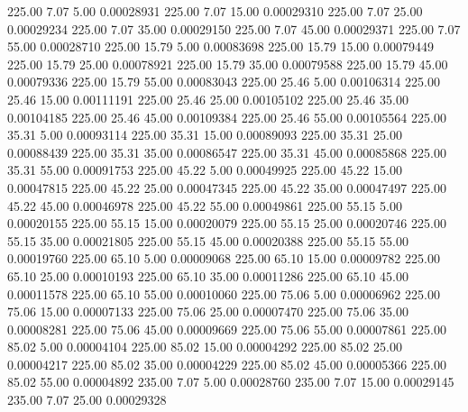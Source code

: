     225.00      7.07      5.00     0.00028931
    225.00      7.07     15.00     0.00029310
    225.00      7.07     25.00     0.00029234
    225.00      7.07     35.00     0.00029150
    225.00      7.07     45.00     0.00029371
    225.00      7.07     55.00     0.00028710
    225.00     15.79      5.00     0.00083698
    225.00     15.79     15.00     0.00079449
    225.00     15.79     25.00     0.00078921
    225.00     15.79     35.00     0.00079588
    225.00     15.79     45.00     0.00079336
    225.00     15.79     55.00     0.00083043
    225.00     25.46      5.00     0.00106314
    225.00     25.46     15.00     0.00111191
    225.00     25.46     25.00     0.00105102
    225.00     25.46     35.00     0.00104185
    225.00     25.46     45.00     0.00109384
    225.00     25.46     55.00     0.00105564
    225.00     35.31      5.00     0.00093114
    225.00     35.31     15.00     0.00089093
    225.00     35.31     25.00     0.00088439
    225.00     35.31     35.00     0.00086547
    225.00     35.31     45.00     0.00085868
    225.00     35.31     55.00     0.00091753
    225.00     45.22      5.00     0.00049925
    225.00     45.22     15.00     0.00047815
    225.00     45.22     25.00     0.00047345
    225.00     45.22     35.00     0.00047497
    225.00     45.22     45.00     0.00046978
    225.00     45.22     55.00     0.00049861
    225.00     55.15      5.00     0.00020155
    225.00     55.15     15.00     0.00020079
    225.00     55.15     25.00     0.00020746
    225.00     55.15     35.00     0.00021805
    225.00     55.15     45.00     0.00020388
    225.00     55.15     55.00     0.00019760
    225.00     65.10      5.00     0.00009068
    225.00     65.10     15.00     0.00009782
    225.00     65.10     25.00     0.00010193
    225.00     65.10     35.00     0.00011286
    225.00     65.10     45.00     0.00011578
    225.00     65.10     55.00     0.00010060
    225.00     75.06      5.00     0.00006962
    225.00     75.06     15.00     0.00007133
    225.00     75.06     25.00     0.00007470
    225.00     75.06     35.00     0.00008281
    225.00     75.06     45.00     0.00009669
    225.00     75.06     55.00     0.00007861
    225.00     85.02      5.00     0.00004104
    225.00     85.02     15.00     0.00004292
    225.00     85.02     25.00     0.00004217
    225.00     85.02     35.00     0.00004229
    225.00     85.02     45.00     0.00005366
    225.00     85.02     55.00     0.00004892
    235.00      7.07      5.00     0.00028760
    235.00      7.07     15.00     0.00029145
    235.00      7.07     25.00     0.00029328
